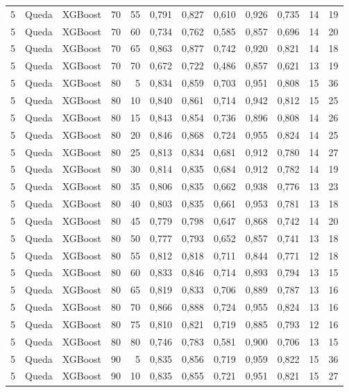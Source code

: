 \begin{longtable}{ccclrrrrrrrr}
5 & Queda & XGBoost & 70 & 55 & 0,791 & 0,827 & 0,610 & 0,926 & 0,735 & 14 & 19 \\
5 & Queda & XGBoost & 70 & 60 & 0,734 & 0,762 & 0,585 & 0,857 & 0,696 & 14 & 20 \\
5 & Queda & XGBoost & 70 & 65 & 0,863 & 0,877 & 0,742 & 0,920 & 0,821 & 14 & 18 \\
5 & Queda & XGBoost & 70 & 70 & 0,672 & 0,722 & 0,486 & 0,857 & 0,621 & 13 & 19 \\
5 & Queda & XGBoost & 80 & 5 & 0,834 & 0,859 & 0,703 & 0,951 & 0,808 & 15 & 36 \\
5 & Queda & XGBoost & 80 & 10 & 0,840 & 0,861 & 0,714 & 0,942 & 0,812 & 15 & 25 \\
5 & Queda & XGBoost & 80 & 15 & 0,843 & 0,854 & 0,736 & 0,896 & 0,808 & 14 & 26 \\
5 & Queda & XGBoost & 80 & 20 & 0,846 & 0,868 & 0,724 & 0,955 & 0,824 & 14 & 25 \\
5 & Queda & XGBoost & 80 & 25 & 0,813 & 0,834 & 0,681 & 0,912 & 0,780 & 14 & 27 \\
5 & Queda & XGBoost & 80 & 30 & 0,814 & 0,835 & 0,684 & 0,912 & 0,782 & 14 & 19 \\
5 & Queda & XGBoost & 80 & 35 & 0,806 & 0,835 & 0,662 & 0,938 & 0,776 & 13 & 23 \\
5 & Queda & XGBoost & 80 & 40 & 0,803 & 0,835 & 0,661 & 0,953 & 0,781 & 13 & 18 \\
5 & Queda & XGBoost & 80 & 45 & 0,779 & 0,798 & 0,647 & 0,868 & 0,742 & 14 & 20 \\
5 & Queda & XGBoost & 80 & 50 & 0,777 & 0,793 & 0,652 & 0,857 & 0,741 & 13 & 18 \\
5 & Queda & XGBoost & 80 & 55 & 0,812 & 0,818 & 0,711 & 0,844 & 0,771 & 12 & 18 \\
5 & Queda & XGBoost & 80 & 60 & 0,833 & 0,846 & 0,714 & 0,893 & 0,794 & 13 & 15 \\
5 & Queda & XGBoost & 80 & 65 & 0,819 & 0,833 & 0,706 & 0,889 & 0,787 & 13 & 16 \\
5 & Queda & XGBoost & 80 & 70 & 0,866 & 0,888 & 0,724 & 0,955 & 0,824 & 13 & 16 \\
5 & Queda & XGBoost & 80 & 75 & 0,810 & 0,821 & 0,719 & 0,885 & 0,793 & 12 & 16 \\
5 & Queda & XGBoost & 80 & 80 & 0,746 & 0,783 & 0,581 & 0,900 & 0,706 & 13 & 15 \\
5 & Queda & XGBoost & 90 & 5 & 0,835 & 0,856 & 0,719 & 0,959 & 0,822 & 15 & 36 \\
5 & Queda & XGBoost & 90 & 10 & 0,835 & 0,855 & 0,721 & 0,951 & 0,821 & 15 & 27 \\

\end{longtable}
